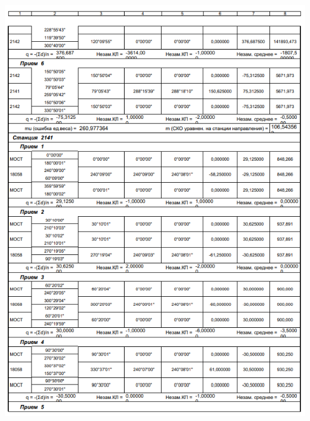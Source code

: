 \documentclass[a4paper]{article}
\begin{document}
\begin{newpage}
\begin{center}
        \includegraphics[scale=1.4]{vedomosty/скп10.png}

\end{center}
\end{newpage}
\end{document}
